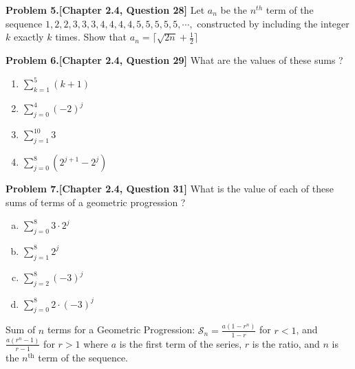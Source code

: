\documentclass[addpoints]{exam}
\begin{document}
\begin{sloppypar}
\begin{questions}
\question
\textbf{Problem 5.[Chapter 2.4, Question 28]}
Let $a_n$ be the $n^{th}$ term of the sequence $1,2,2,3,3,3,4,4,4,4,5,5,5,5,5,\cdots,$ constructed by
including the integer $k$ exactly $k$ times. Show that $a_n = \lceil \sqrt{2n} + \frac{1}{2} \rceil$
\begin{solution}
    
\end{solution}

\question
\textbf{Problem 6.[Chapter 2.4, Question 29]}
    What are the values of these sums ?
    \begin{enumerate}
        \item $\sum_{k=1}^{5} (k+1)$
        \item $\sum_{j=0}^{4} (-2)^j$
        \item $\sum_{j=1}^{10} 3$
        \item $\sum_{j=0}^{8} (2^{j+1} - 2^{j})$
    \end{enumerate}
\begin{solution}
\end{solution}
\newpage
\question
\textbf{Problem 7.[Chapter 2.4, Question 31]}
    What is the value of each of these sums of terms of a geometric progression ?
    \begin{enumerate}[(a)]
        \item $\sum_{j=0}^{8} 3 \cdot 2^j $
        \item $\sum_{j=1}^{8}  2^j $
        \item $\sum_{j=2}^{8}  (-3)^j $
        \item $\sum_{j=0}^{8} 2 \cdot (-3)^j $
    \end{enumerate}
\begin{solution}
    
    Sum of $n$ terms for a Geometric Progression: $ \mathcal{S}_n = \displaystyle\frac{a(1 - r^n)}{1 - r} $ for $ r < 1 $, and $ \displaystyle\frac{a(r^n - 1)}{r - 1} $ for $ r > 1 $ where $a$ is the first term of the series, $r$ is the ratio, and $n$ is the $n^{\text{th}}$ term of the sequence.
    \begin{parts}

\end{parts}
\end{solution}
\end{questions}
\end{sloppypar}
\end{document}
